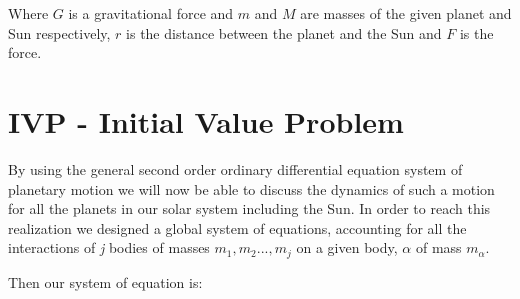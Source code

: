 \documentclass[a4paper]{article}
\begin{document}
Where $G$ is a gravitational force and $m$ and $M$ are masses of the given planet and Sun respectively, $r$ is the distance between the planet and the Sun and $F$ is the force.

\pagebreak

\section{IVP - Initial Value Problem}
By using the general second order ordinary differential equation system of planetary motion we will now be able to discuss the dynamics of such a motion for all the planets in our solar system including the Sun. In order to reach this realization we designed a global system of equations, accounting for all the interactions of \textit{j} bodies of masses $m_{1},m_{2}...,m_{j}$ on a given body, $\alpha$ of mass $m_{\alpha}$.

Then our system of equation is:\\
\end{document}
